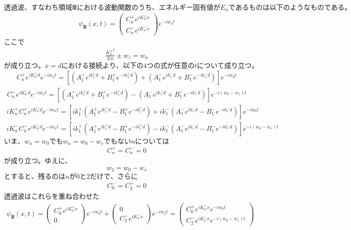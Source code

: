 $透過波、すなわち領域Ⅲにおける波動関数のうち、エネルギー固有値がE_{n}であるものは以下のようなものである。$
\begin{align}
{\psi}_{Ⅲ}(x,t)=
\begin{pmatrix}
C_{n}^{+}e^{iK_{n}^{+}x} \\
C_{n}^{-}e^{iK_{n}^{-}x}
\end{pmatrix}
e^{-iw_{n}t}
\end{align}
ここで
\begin{align}
\frac{{K_{n}^{\pm}}^2}{2m}{\pm}w_{z}=w_{n}
\end{align}
$が成り立つ。x=dにおける接続より、以下の4つの式が任意のtについて成り立つ。$
\begin{align}
C_{n}^{+}e^{iK_{n}^{+}d}e^{-iw_{n}t}=\left[(A_{1}^{+}e^{ik_{1}^{+}d}+B_{1}^{+}e^{-ik_{1}^{+}d})+(A_{1}^{-}e^{ik_{1}^{-}d}+B_{1}^{-}e^{-ik_{1}^{-}d})\right]e^{-iw_{0}t}
\end{align}
\begin{align}
C_{n}^{-}e^{iK_{n}^{-}d}e^{-iw_{n}t}=\left[(A_{1}^{+}e^{ik_{1}^{+}d}+B_{1}^{+}e^{-ik_{1}^{+}d})-(A_{1}^{-}e^{ik_{1}^{-}d}+B_{1}^{-}e^{-ik_{1}^{-}d})\right]e^{-i(w_{0}-w_{s})t}
\end{align}
\begin{align}
iK_{n}^{+}C_{n}^{+}e^{iK_{n}^{+}d}e^{-iw_{n}t}=\left[ik_{1}^{+}(A_{1}^{+}e^{ik_{1}^{+}d}-B_{1}^{+}e^{-ik_{1}^{+}d})+ik_{1}^{-}(A_{1}^{-}e^{ik_{1}^{-}d}-B_{1}^{-}e^{-ik_{1}^{-}d})\right]e^{-iw_{0}t}
\end{align}
\begin{align}
iK_{n}^{-}C_{n}^{-}e^{iK_{n}^{-}d}e^{-iw_{n}t}=\left[ik_{1}^{+}(A_{1}^{+}e^{ik_{1}^{+}d}-B_{1}^{+}e^{-ik_{1}^{+}d})-ik_{1}^{-}(A_{1}^{-}e^{ik_{1}^{-}d}-B_{1}^{-}e^{-ik_{1}^{-}d})\right]e^{-i(w_{0}-w_{s})t}
\end{align}
$いま、w_{n}=w_{0}でもw_{n}=w_{0}-w_{s}でもないnについては$
\begin{align}
C_{n}^{+}=C_{n}^{-}=0
\end{align}
が成り立つ。ゆえに、
\begin{align}
w_{2}=w_{0}-w_{s}
\end{align}
$とすると、残るのはnが0と2だけで、さらに$
\begin{align}
C_{0}^{-}=C_{2}^{+}=0
\end{align}
透過波はこれらを重ね合わせた
\begin{align}
{\psi}_{Ⅲ}(x,t)=
\begin{pmatrix}
C_{0}^{+}e^{iK_{0}^{+}x} \\
0
\end{pmatrix}
e^{-iw_{0}t}+
\begin{pmatrix}
0 \\
C_{2}^{-}e^{iK_{2}^{-}x}
\end{pmatrix}
e^{-iw_{2}t}
=\begin{pmatrix}
C_{0}^{+}e^{iK_{0}^{+}x}e^{-iw_{0}t} \\
C_{2}^{-}e^{iK_{2}^{-}x}e^{-i(w_{0}-w_{s})t}
\end{pmatrix}
\end{align}
